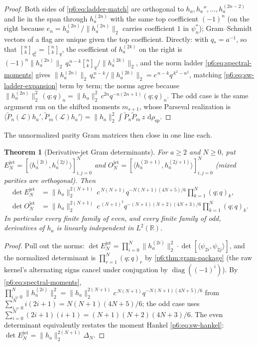 \documentclass[11pt,oneside]{article}
\numberwithin{equation}{section}
\newtheorem{theorem}{Theorem}[section]
\theoremstyle{definition}
\theoremstyle{remark}
\newcommand{\R}{\mathbb R}
\newcommand{\dd}{\,\mathrm d}
\newcommand{\qbinom}[3]{\genfrac{[}{]}{0pt}{}{#1}{#2}_{#3}}
\begin{document}
\begin{proof}
Both sides of \eqref{p6:eq:ladder-match} are orthogonal to
$h_a,h_a'',\ldots,h_a^{(2n-2)}$ and lie in the span through $h_a^{(2n)}$
with the same top coefficient $(-1)^n$ (on the right because
$e_n=h_a^{(2n)}/\|h_a^{(2n)}\|_2$ carries coefficient $1$ in
$\psi_n^{\ast}$); Gram--Schmidt vectors of a flag are unique given the top
coefficient.  Directly: with $q_\ast=a^{-1}$, so that
$\qbinom nk{q_\ast^2}=\qbinom nkq$, the coefficient of $h_a^{(2k)}$ on the
right is $(-1)^n\|h_a^{(2n)}\|_2\,q_\ast^{\,n-k}\qbinom nkq\big/
\|h_a^{(2k)}\|_2$, and the norm ladder \eqref{p6:eq:spectral-moments} gives
$\|h_a^{(2n)}\|_2\,q_\ast^{\,n-k}/\|h_a^{(2k)}\|_2=c^{\,n-k}q^{\,k^2-n^2}$,
matching \eqref{p6:eq:sw-ladder-expansion} term by term; the norms agree
because $\|h_a^{(2n)}\|_2^2\,(q;q)_n
=\|h_a\|_2^2\,c^{2n}q^{-n(2n+1)}(q;q)_n$.  The odd case is the same
argument run on the shifted moments $m_{s+1}$, whose Parseval realization
is $\langle\widetilde P_n(\mathcal L)h_a',\widetilde P_m(\mathcal
L)h_a'\rangle=\|h_a\|_2^2\int\widetilde P_n\widetilde P_m\,z\,
\dd\rho_{\mathrm{sp}}$.
\end{proof}

The unnormalized parity Gram matrices then close in one line each.

\begin{theorem}[Derivative-jet Gram determinants]\label{p6:thm:jet-gram}
For $a\ge2$ and $N\ge0$, put
$E_N^{\mathrm{jet}}=[\langle h_a^{(2i)},h_a^{(2j)}\rangle]_{i,j=0}^{N}$ and
$O_N^{\mathrm{jet}}=[\langle h_a^{(2i+1)},h_a^{(2j+1)}\rangle]_{i,j=0}^{N}$
(mixed parities are orthogonal).  Then
\begin{align}
 \det E_N^{\mathrm{jet}}
 &=\|h_a\|_2^{2(N+1)}\,c^{\,N(N+1)}q^{-N(N+1)(4N+5)/6}
 \prod_{k=1}^{N}(q;q)_k,
 \label{p6:eq:jet-gram-even}\\
 \det O_N^{\mathrm{jet}}
 &=\|h_a\|_2^{2(N+1)}\,c^{\,(N+1)^2}q^{-(N+1)(N+2)(4N+3)/6}
 \prod_{k=1}^{N}(q;q)_k.
 \label{p6:eq:jet-gram-odd}
\end{align}
In particular every finite family of even, and every finite family of odd,
derivatives of $h_a$ is linearly independent in $L^2(\R)$.
\end{theorem}

\begin{proof}
Pull out the norms:
$\det E_N^{\mathrm{jet}}
=\prod_{i=0}^{N}\|h_a^{(2i)}\|_2^2\cdot
\det[\langle\psi_{2i},\psi_{2j}\rangle]$, and the normalized determinant is
$\prod_{r=1}^{N}(q;q)_r$ by \cref{p6:thm:gram-package} (the raw kernel's
alternating signs cancel under conjugation by
$\operatorname{diag}((-1)^i)$).  By \eqref{p6:eq:spectral-moments},
$\prod_{i=0}^{N}\|h_a^{(2i)}\|_2^2
=\|h_a\|_2^{2(N+1)}c^{\,N(N+1)}q^{-N(N+1)(4N+5)/6}$ from
$\sum_{i=0}^{N}i(2i+1)=N(N+1)(4N+5)/6$; the odd case uses
$\sum_{i=0}^{N}(2i+1)(i+1)=(N+1)(N+2)(4N+3)/6$.  The even determinant
equivalently restates the moment Hankel \eqref{p6:eq:sw-hankel}:
$\det E_N^{\mathrm{jet}}=\|h_a\|_2^{2(N+1)}\Delta_N$.
\end{proof}
\end{document}
